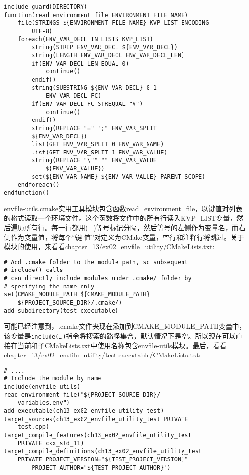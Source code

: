 \begin{lstlisting}[style=styleCMake]
include_guard(DIRECTORY)
function(read_environment_file ENVIRONMENT_FILE_NAME)
	file(STRINGS ${ENVIRONMENT_FILE_NAME} KVP_LIST ENCODING
		UTF-8)
	foreach(ENV_VAR_DECL IN LISTS KVP_LIST)
		string(STRIP ENV_VAR_DECL ${ENV_VAR_DECL})
		string(LENGTH ENV_VAR_DECL ENV_VAR_DECL_LEN)
		if(ENV_VAR_DECL_LEN EQUAL 0)
			continue()
		endif()
		string(SUBSTRING ${ENV_VAR_DECL} 0 1
			ENV_VAR_DECL_FC)
		if(ENV_VAR_DECL_FC STREQUAL "#")
			continue()
		endif()
		string(REPLACE "=" ";" ENV_VAR_SPLIT
		${ENV_VAR_DECL})
		list(GET ENV_VAR_SPLIT 0 ENV_VAR_NAME)
		list(GET ENV_VAR_SPLIT 1 ENV_VAR_VALUE)
		string(REPLACE "\"" "" ENV_VAR_VALUE
			${ENV_VAR_VALUE})
		set(${ENV_VAR_NAME} ${ENV_VAR_VALUE} PARENT_SCOPE)
	endforeach()
endfunction()
\end{lstlisting}

envfile-utils.cmake实用工具模块包含函数read\_environment\_file，以键值对列表的格式读取一个环境文件。这个函数将文件中的所有行读入KVP\_LIST变量，然后遍历所有行。每一行都用(=)等号标记分隔，然后等号的左侧作为变量名，而右侧作为变量值，将每个“键-值”对定义为CMake变量，空行和注释行将跳过。关于模块的使用，来看看chapter\_13/ex02\_envfile\_utility/CMakeLists.txt:

\begin{lstlisting}[style=styleCMake]
# Add .cmake folder to the module path, so subsequent 
# include() calls
# can directly include modules under .cmake/ folder by
# specifying the name only.
set(CMAKE_MODULE_PATH ${CMAKE_MODULE_PATH}
	${PROJECT_SOURCE_DIR}/.cmake/)
add_subdirectory(test-executable)
\end{lstlisting}

可能已经注意到，.cmake文件夹现在添加到CMAKE\_MODULE\_PATH变量中，该变量是\texttt{include(…)}指令将搜索的路径集合，默认情况下是空。所以现在可以直接在当前和子CMakeLists.txt中使用名称包含envfile-utils模块。最后，看看chapter\_13/ex02\_envfile\_utility/test-executable/CMakeLists.txt:

\begin{lstlisting}[style=styleCMake]
# ....
# Include the module by name
include(envfile-utils)
read_environment_file("${PROJECT_SOURCE_DIR}/
	variables.env")
add_executable(ch13_ex02_envfile_utility_test)
target_sources(ch13_ex02_envfile_utility_test PRIVATE
	test.cpp)
target_compile_features(ch13_ex02_envfile_utility_test
	PRIVATE cxx_std_11)
target_compile_definitions(ch13_ex02_envfile_utility_test
	PRIVATE PROJECT_VERSION="${TEST_PROJECT_VERSION}"
		PROJECT_AUTHOR="${TEST_PROJECT_AUTHOR}")
\end{lstlisting}

